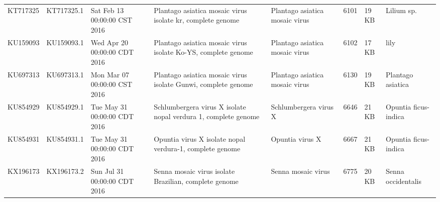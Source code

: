 \documentclass[11pt]{article}
\begin{document}
\begin{supptable}[ht]
{{\begin{tabular}{@{}llllllll@{}}
KT717325 & KT717325.1 & Sat Feb 13 00:00:00 CST 2016 & Plantago asiatica mosaic virus isolate kr, complete genome                                                                                                                                                                                                       & Plantago asiatica mosaic virus & 6101            & 19 KB & Lilium sp.                            \\
KU159093 & KU159093.1 & Wed Apr 20 00:00:00 CDT 2016 & Plantago asiatica mosaic virus isolate Ko-YS, complete genome                                                                                                                                                                                                    & Plantago asiatica mosaic virus & 6102            & 17 KB & lily                                  \\
KU697313 & KU697313.1 & Mon Mar 07 00:00:00 CST 2016 & Plantago asiatica mosaic virus isolate Gunwi, complete genome                                                                                                                                                                                                    & Plantago asiatica mosaic virus & 6130            & 19 KB & Plantago asiatica                     \\
KU854929 & KU854929.1 & Tue May 31 00:00:00 CDT 2016 & Schlumbergera virus X isolate nopal verdura 1, complete genome                                                                                                                                                                                                   & Schlumbergera virus X          & 6646            & 21 KB & Opuntia ficus-indica                  \\
KU854931 & KU854931.1 & Tue May 31 00:00:00 CDT 2016 & Opuntia virus X isolate nopal verdura-1, complete genome                                                                                                                                                                                                         & Opuntia virus X                & 6667            & 21 KB & Opuntia ficus-indica                  \\
KX196173 & KX196173.2 & Sun Jul 31 00:00:00 CDT 2016 & Senna mosaic virus isolate Brazilian, complete genome                                                                                                                                                                                                            & Senna mosaic virus             & 6775            & 20 KB & Senna occidentalis                    \\

\end{tabular}}}
\end{supptable}
\end{document}
